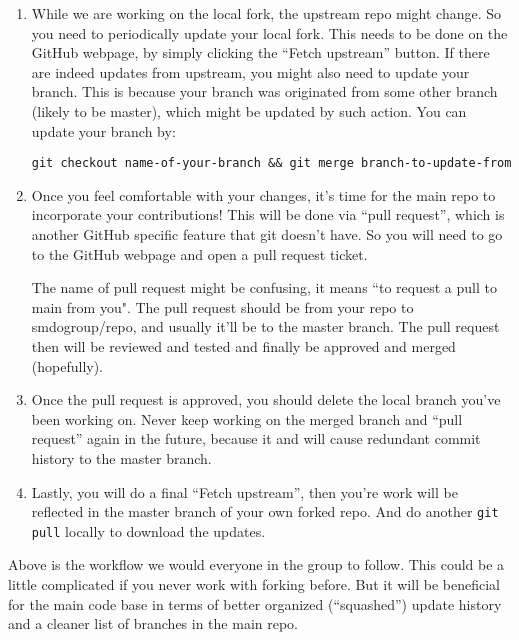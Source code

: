 \documentclass{article}
\begin{document}
\begin{enumerate}
    \item
    While we are working on the local fork, the upstream repo might change.
    So you need to periodically update your local fork.
    This needs to be done on the GitHub webpage, by simply clicking the ``Fetch upstream'' button.
    If there are indeed updates from upstream, you might also need to update your branch.
    This is because your branch was originated from some other branch (likely to be master),
    which might be updated by such action.
    You can update your branch by:

    \texttt{git checkout name-of-your-branch \&\& git merge branch-to-update-from}

    \item
    Once you feel comfortable with your changes, it's time for the main repo to incorporate your
    contributions!
    This will be done via ``pull request'', which is another GitHub specific feature that git doesn't
    have. So you will need to go to the GitHub webpage and open a pull request ticket.

    The name of pull request might be confusing, it means ``to request a pull to main from you".
    The pull request should be from your repo to smdogroup/repo, and usually it'll be to the master
    branch.
    The pull request then will be reviewed and tested and finally be approved and merged (hopefully).

    \item
    Once the pull request is approved, you should delete the local branch you've been working on.
    Never keep working on the merged branch and ``pull request'' again in the future,
    because it and will cause redundant commit history to the master branch.

    \item
    Lastly, you will do a final ``Fetch upstream'', then you're work will be reflected in the master
    branch of your own forked repo.
    And do another \texttt{git pull} locally to download the updates.

\end{enumerate}

Above is the workflow we would everyone in the group to follow.
This could be a little complicated if you never work with forking before.
But it will be beneficial for the main code base in terms of better organized (``squashed'')
update history and a cleaner list of branches in the main repo.
\end{document}
